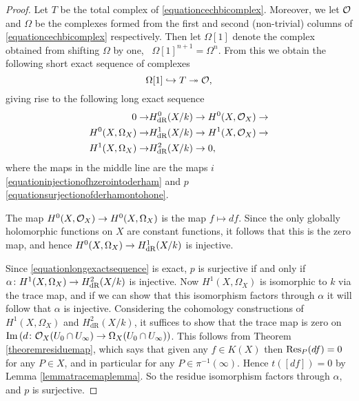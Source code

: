     \begin{proof}
    Let $T$ be the total complex of \eqref{equationcechbicomplex}.
    Moreover, we let ${\cal O}$ and $\Omega$ be the complexes formed from the first and second (non-trivial) columns of \eqref{equationcechbicomplex} respectively.
    Then let $\Omega[1]$ denote the complex obtained from shifting $\Omega$ by one, \ie~$\Omega[1]^{n+1} = \Omega^n$.
    From this we obtain the following short exact sequence of complexes 
        \[
        \Omega[1] \hookrightarrow T \twoheadrightarrow {\cal O},
        \]
    giving rise to the following long exact sequence
        \begin{align} \label{equationlongexactsequence}
        \begin{split}
        0 \rightarrow & H^0_{\text {dR}}(X/k) \rightarrow   H^0(X,{\cal O}_X) \rightarrow \\ 
        H^0(X,\Omega_X) \rightarrow & H_{\text {dR}}^1(X/k) \rightarrow   H^1(X,\mathcal{O}_X) \rightarrow  \\
        H^1(X,\Omega_X) \rightarrow & H^2_{\text {dR}}(X/k) \rightarrow   0, 
        \end{split}
        \end{align} 
    where the maps in the middle line are the maps $i$ \eqref{equationinjectionofhzerointoderham} and $p$ \eqref{equationsurjectionofderhamontohone}.


    The map $H^0(X,{\cal O}_X) \rightarrow {H^0(X,\Omega_X)}$ is the map $f \mapsto df$.
    Since the only globally holomorphic functions on $X$ are constant functions, it follows that this is the zero map, and hence ${H^0(X,\Omega_X)} \rightarrow H_{\text {dR}}^1(X/k)$ is injective.
    
    Since \eqref{equationlongexactsequence} is exact, $p$ is surjective if and only if $\alpha \colon H^1(X,\Omega_X) \rightarrow H^2_{\text {dR}}(X/k)$ is injective.
    Now $H^1(X,\Omega_X)$ is isomorphic to $k$ via the trace map, and if we can show that this isomorphism factors through $\alpha$ it will follow that $\alpha$ is injective.
    Considering the \cech cohomology constructions of $H^1(X,\Omega_X)$ and $H^2_{\text {dR}}(X/k)$, it suffices to show that the trace map is zero on $\operatorname{Im} \left( d \colon {\cal O}_X(U_0 \cap U_\infty) \rightarrow \Omega_X(U_0 \cap U_\infty) \right)$.
    This follows from Theorem \ref{theoremresiduemap}, which says that given any $f \in K(X)$ then $\operatorname{Res}_P(df)=0$ for any $P \in X$, and in particular for any $P \in \pi^{-1}(\infty)$.
    Hence $t\left([df]\right) = 0$ by Lemma \ref{lemmatracemaplemma}.
    So the residue isomorphism factors through $\alpha$, and $p$ is surjective.
    \end{proof}

